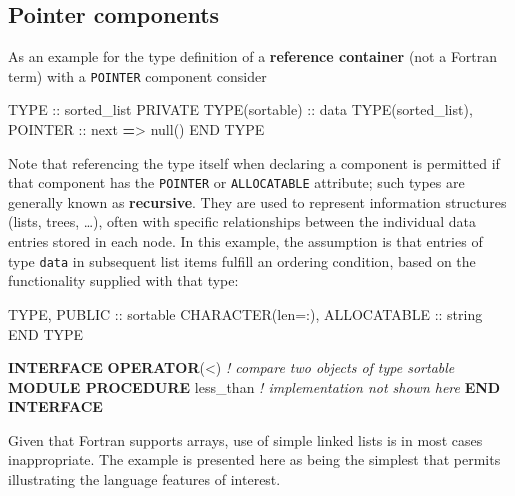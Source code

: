 \documentclass[
]{article}
\newenvironment{Shaded}{}{}
\newcommand{\CommentTok}[1]{\textcolor[rgb]{0.38,0.63,0.69}{\textit{#1}}}
\newcommand{\DataTypeTok}[1]{\textcolor[rgb]{0.56,0.13,0.00}{#1}}
\newcommand{\KeywordTok}[1]{\textcolor[rgb]{0.00,0.44,0.13}{\textbf{#1}}}
\newcommand{\NormalTok}[1]{#1}
\newcommand{\OperatorTok}[1]{\textcolor[rgb]{0.40,0.40,0.40}{#1}}
\begin{document}
\subsection{Pointer components}\label{pointer-components}

As an example for the type definition of a \textbf{reference container}
(not a Fortran term) with a \texttt{POINTER} component consider

\begin{Shaded}
\begin{Highlighting}[]
\DataTypeTok{TYPE} \DataTypeTok{::}\NormalTok{ sorted\_list}
   \DataTypeTok{PRIVATE}
   \DataTypeTok{TYPE(sortable)} \DataTypeTok{::}\NormalTok{ data}
   \DataTypeTok{TYPE(sorted\_list)}\NormalTok{, }\DataTypeTok{POINTER} \DataTypeTok{::}\NormalTok{ next }\KeywordTok{=}\OperatorTok{\textgreater{}}\NormalTok{ null()}
\DataTypeTok{END TYPE}
\end{Highlighting}
\end{Shaded}

Note that referencing the type itself when declaring a component is
permitted if that component has the \texttt{POINTER} or
\texttt{ALLOCATABLE} attribute; such types are generally known as
\textbf{recursive}. They are used to represent information structures
(lists, trees, \ldots), often with specific relationships between the
individual data entries stored in each node. In this example, the
assumption is that entries of type \texttt{data} in subsequent list
items fulfill an ordering condition, based on the functionality supplied
with that type:

\begin{Shaded}
\begin{Highlighting}[]
\DataTypeTok{TYPE}\NormalTok{, }\DataTypeTok{PUBLIC} \DataTypeTok{::}\NormalTok{ sortable}
   \DataTypeTok{CHARACTER(len=:)}\NormalTok{, }\DataTypeTok{ALLOCATABLE} \DataTypeTok{::}\NormalTok{ string}
\DataTypeTok{END TYPE}

\KeywordTok{INTERFACE} \KeywordTok{OPERATOR}\NormalTok{(}\OperatorTok{\textless{}}\NormalTok{)          }\CommentTok{! compare two objects of type sortable}
   \KeywordTok{MODULE PROCEDURE}\NormalTok{ less\_than  }\CommentTok{! implementation not shown here}
\KeywordTok{END INTERFACE}
\end{Highlighting}
\end{Shaded}

Given that Fortran supports arrays, use of simple linked lists is in
most cases inappropriate. The example is presented here as being the
simplest that permits illustrating the language features of interest.
\end{document}
